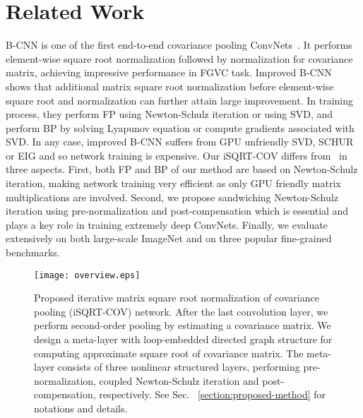 \documentclass[10pt,twocolumn,letterpaper]{article}
\begin{document}
\section{Related Work}\label{section:related-work}

B-CNN is one of the first end-to-end covariance  pooling ConvNets~\cite{lin2015bilinear,Ionescu_2015_ICCV}. It performs element-wise  square root normalization followed by normalization for covariance matrix, achieving impressive performance in FGVC task. Improved B-CNN~\cite{lin2017improved} shows that additional matrix square root normalization before element-wise square root and normalization  can further attain  large  improvement. In training process, they perform FP using Newton-Schulz iteration  or using SVD, and perform BP by solving Lyapunov equation or compute gradients associated with SVD. In any  case, improved B-CNN suffers from GPU unfriendly  SVD, SCHUR or EIG and so network training is expensive. Our iSQRT-COV differs from~\cite{lin2017improved} in three aspects. First, both FP and BP of our method are based on Newton-Schulz iteration, making network training very efficient as only GPU friendly matrix multiplications are involved. Second, we propose sandwiching    Newton-Schulz iteration using  pre-normalization  and post-compensation which is essential and plays a key role in training extremely  deep ConvNets. Finally, we evaluate extensively on both large-scale ImageNet and  on three popular fine-grained benchmarks. 

\begin{figure*}[t]
\begin{center}
   \texttt{[image: overview.eps]}
\end{center}
\caption{Proposed iterative matrix square root normalization of covariance pooling  (iSQRT-COV) network. After the last convolution layer, we perform second-order pooling by estimating a covariance matrix. We design a meta-layer with loop-embedded directed graph structure for computing approximate square root of covariance matrix. The meta-layer  consists of  three  nonlinear structured layers, performing pre-normalization, coupled  Newton-Schulz iteration and post-compensation, respectively.  See Sec. ~\ref{section:proposed-method} for  notations and  details.}
\label{fig:overview}
\end{figure*}
\end{document}
